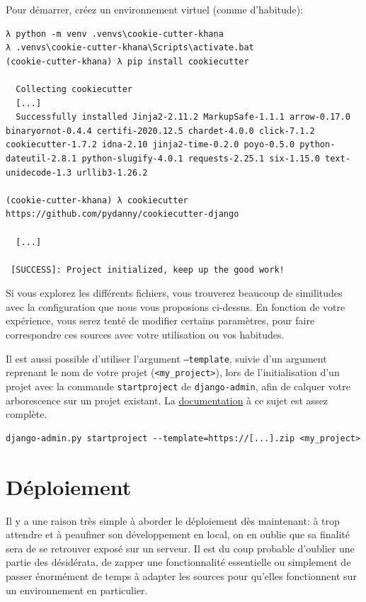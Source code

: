 \documentclass[11pt]{amsbook}
\begin{document}
Pour démarrer, créez un environnement virtuel (comme d’habitude):


\begin{verbatim}
λ python -m venv .venvs\cookie-cutter-khana
λ .venvs\cookie-cutter-khana\Scripts\activate.bat
(cookie-cutter-khana) λ pip install cookiecutter

  Collecting cookiecutter
  [...]
  Successfully installed Jinja2-2.11.2 MarkupSafe-1.1.1 arrow-0.17.0 binaryornot-0.4.4 certifi-2020.12.5 chardet-4.0.0 click-7.1.2 cookiecutter-1.7.2 idna-2.10 jinja2-time-0.2.0 poyo-0.5.0 python-dateutil-2.8.1 python-slugify-4.0.1 requests-2.25.1 six-1.15.0 text-unidecode-1.3 urllib3-1.26.2

(cookie-cutter-khana) λ cookiecutter https://github.com/pydanny/cookiecutter-django

  [...]

 [SUCCESS]: Project initialized, keep up the good work!
\end{verbatim}

Si vous explorez les différents fichiers, vous trouverez beaucoup de similitudes avec la configuration que nous vous proposions ci-dessus.
En fonction de votre expérience, vous serez tenté de modifier certains paramètres, pour faire correspondre ces sources avec votre utilisation ou vos habitudes.


Il est aussi possible d’utiliser l’argument \texttt{--template}, suivie d’un argument reprenant le nom de votre projet (\texttt{<my\_project>}), lors de l’initialisation d’un projet avec la commande \texttt{startproject} de \texttt{django-admin}, afin de calquer votre arborescence sur un projet existant.
La \href{https://docs.djangoproject.com/en/stable/ref/django-admin/#startproject}{documentation} à ce sujet est assez complète.

\begin{verbatim}
django-admin.py startproject --template=https://[...].zip <my_project>
\end{verbatim}

\hypertarget{x-déploiement}{\part*{Déploiement}}
Il y a une raison très simple à aborder le déploiement dès maintenant: à trop attendre et à peaufiner son développement en local, on en oublie que sa finalité sera de se retrouver exposé sur un serveur.
Il est du coup probable d’oublier une partie des désidérata, de zapper une fonctionnalité essentielle ou simplement de passer énormément de temps à adapter les sources pour qu’elles fonctionnent sur un environnement en particulier.
\end{document}
